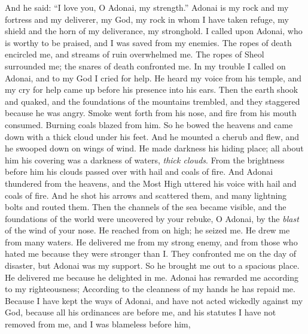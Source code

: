 \begin{biblechapter} %
 And he said: 
“I love you, O Adonai, my strength.”
\verse Adonai is my rock and my fortress and my deliverer, 
my God, my rock in whom I have taken refuge, 
my shield and the horn of my deliverance, my stronghold.
\verse I called upon Adonai, who is worthy to be praised, 
and I was saved from my enemies.
\verse The ropes of death encircled me, 
and streams of ruin overwhelmed me.
\verse The ropes of Sheol surrounded me; 
the snares of death confronted me.
\verse In my trouble I called on Adonai, 
and to my God I cried for help. 
He heard my voice from his temple, 
and my cry for help 
came up before his presence into his ears.
\verse Then the earth shook and quaked, 
and the foundations of the mountains trembled, 
and they staggered because he was angry.
\verse Smoke went forth from his nose, 
and fire from his mouth consumed. 
Burning coals blazed from him.
\verse So he bowed the heavens and came down 
with a thick cloud under his feet.
\verse And he mounted a cherub and flew, 
and he swooped down on wings of wind.
\verse He made darkness his hiding place; 
all about him his covering 
was a darkness of waters, \textit{thick clouds}.
\verse From the brightness before him 
his clouds passed over 
with hail and coals of fire.
\verse And Adonai thundered from the heavens, 
and the Most High uttered his voice 
with hail and coals of fire.
\verse And he shot his arrows and scattered them, 
and many lightning bolts and routed them.
\verse Then the channels of the sea became visible, 
and the foundations of the world were uncovered 
by your rebuke, O Adonai, 
by the \textit{blast} of the wind of your nose.
\verse He reached from on high; he seized me. 
He drew me from many waters.
\verse He delivered me from my strong enemy, 
and from those who hated me 
because they were stronger than I.
\verse They confronted me on the day of disaster, 
but Adonai was my support.
\verse So he brought me out to a spacious place. 
He delivered me because he delighted in me.
\verse Adonai has rewarded me according to my righteousness; 
According to the cleanness of my hands 
he has repaid me.
\verse Because I have kept the ways of Adonai, 
and have not acted wickedly against my God,
\verse because all his ordinances are before me, 
and his statutes I have not removed from me,
\verse and I was blameless before him, 

\end{biblechapter}
